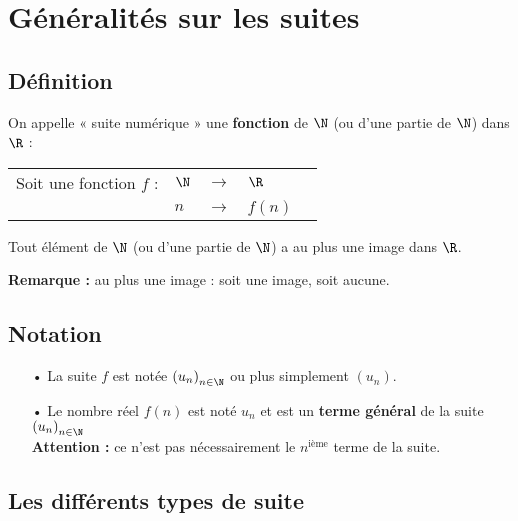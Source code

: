 
\ifdefined\COMPLETE
\else
    
    
\fi




\section{Généralités sur les suites}

\subsection{Définition}

On appelle « suite numérique » une \textbf{fonction} de $\N$ (ou d'une partie de $\N$) dans $\R$ : \\

\begin{tabular}{lllll}
Soit une fonction $f$ : & $\N$ & $\longrightarrow$ & $\R$ \\
& $n$ & $\longrightarrow$ & $f\left(n\right)$ \\ 
\end{tabular}

\vspace*{.3cm}

Tout élément de $\N$ (ou d'une partie de $\N$) a au plus une image dans $\R$.

\textbf{Remarque :} au plus une image : soit une image, soit aucune. 

\subsection{Notation}

\begin{itemize}
\item[•] La suite $f$ est notée $\left(u_n\right)_{n \in \N}$ ou plus simplement $\left(u_n\right)$. \\

\item[•] Le nombre réel $f\left(n\right)$ est noté $u_n$ et est un \textbf{terme général} de la suite $\left(u_n\right)_{n \in \N}$ \\

\textbf{Attention :} ce n'est pas nécessairement le $n^\mathrm{ième}$ terme de la suite. 
\end{itemize}

\subsection{Les différents types de suite}

